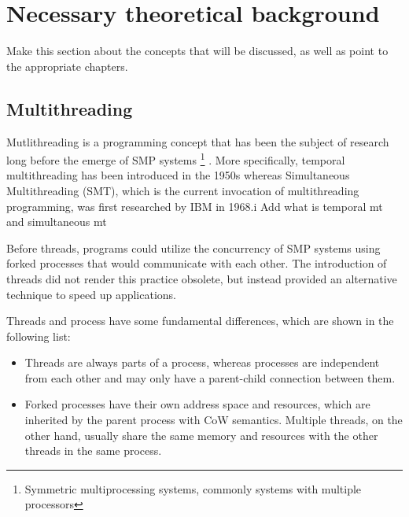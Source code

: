 \chapter{Necessary theoretical background}\label{ch:theory}

\fixme Make this section about the concepts that will be discussed, as well as 
point to the appropriate chapters.

\begin{comment}
In this typically boring section, we will explain the basic system facilities 
and programming concepts that are used by our implementation and Archipelago in 
general. More specifically, in Section ?...
\end{comment}

\section{Multithreading}

Mutlithreading is a programming concept that has been the subject of research 
long before the emerge of SMP systems
\footnote{Symmetric multiprocessing systems, commonly systems with multiple 
	processors}
. More specifically, temporal multithreading has been introduced in the 1950s 
whereas Simultaneous Multithreading (SMT), which is the current invocation of 
multithreading programming, was first researched by IBM in 1968\cite{mt}.i 
\todo Add what is temporal mt and simultaneous mt

Before threads, programs could utilize the concurrency of SMP systems using 
forked processes that would communicate with each other. The introduction of 
threads did not render this practice obsolete, but instead provided an 
alternative technique to speed up applications.

Threads and process have some fundamental differences, which are shown in the 
following list:

\begin{itemize}
	\item Threads are always parts of a process, whereas processes are 
		independent from each other and may only have a parent-child connection 
		between them.
	\item Forked processes have their own address space and resources, which 
		are inherited by the parent process with CoW semantics.  Multiple 
		threads, on the other hand, usually share the same memory and resources 
		with the other threads in the same process.
\end{itemize}

